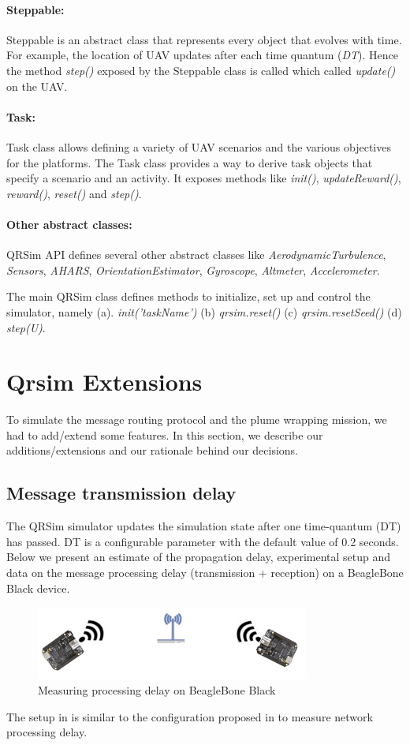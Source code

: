 \paragraph{Steppable:} Steppable is an abstract class that represents every object that evolves with time. For example, the location of UAV updates after each time quantum (\emph{DT}). Hence the method \emph{step()} exposed by the Steppable class is called which called \emph{update()} on the UAV.
\paragraph{Task:}
Task class allows defining a variety of UAV scenarios and the various objectives for the platforms. The Task class provides a way to derive task objects that specify a scenario and an activity. It exposes methods like \emph{init()}, \emph{updateReward()}, \emph{reward()}, \emph{reset()} and \emph{step()}.
\paragraph{Other abstract classes:}
QRSim API defines several other abstract classes like \emph{AerodynamicTurbulence}, \emph{Sensors}, \emph{AHARS}, \emph{OrientationEstimator}, \emph{Gyroscope}, \emph{Altmeter}, \emph{Accelerometer}.

The main QRSim class defines methods to initialize, set up and control the simulator, namely (a). \emph{init('taskName')} (b) \emph{qrsim.reset()} (c) \emph{qrsim.resetSeed()} (d) \emph{step(U)}.

\section{Qrsim Extensions}

To simulate the message routing protocol and the plume wrapping mission, we had to add/extend some features. In this section, we describe our additions/extensions and our rationale behind our decisions.
\subsection{Message transmission delay}
The QRSim simulator updates the simulation state after one time-quantum (DT) has passed. DT is a configurable parameter with the default value of 0.2 seconds. Below we present an estimate of the propagation delay, experimental setup and data on the message processing delay (transmission + reception) on a BeagleBone Black device.
\begin{figure}[hbtp]
\centering
\includegraphics[width=0.8\textwidth]{Chapter-4/figs/beaglebone}
\caption{Measuring processing delay on BeagleBone Black}
\label{fig:proc_delay_setup}
\end{figure}
The setup in  is similar to the configuration proposed in \cite{1378257} to measure network processing delay.

